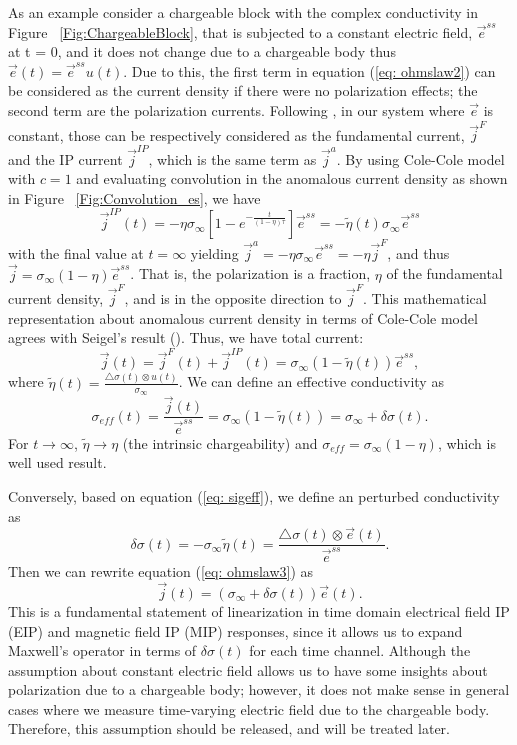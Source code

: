 \documentclass[a4paper, 11pt]{article}
\newcommand{\siginf}{\sigma_\infty}
\newcommand{\dsig}{\triangle\sigma}
\renewcommand {\j}  { {\vec j} }
\newcommand {\e}  { {\vec e} }
\newcommand{\peta}{\tilde{\eta}}
\newcommand{\sigpert}{\delta\sigma}
\begin{document}
As an example consider a chargeable block with the complex conductivity in Figure ~\ref{Fig:ChargeableBlock}, that is subjected to a constant electric field, $\e^{ss}$ at t = 0, and it does not change due to a chargeable body thus $\e(t) = \e^{ss}u(t)$. Due to this, the first term in equation (\ref{eq: ohmslaw2}) can be considered as the current density if there were no polarization effects; the second term are the polarization currents. Following \cite{Smith1988a}, in our system where $\e$ is constant, those can be respectively considered as the fundamental current, $\j^{F}$ and the IP current $\j^{IP}$, which is the same term as $\j^a$. By using Cole-Cole model with $c=1$  and evaluating convolution in the anomalous current density as shown in Figure ~\ref{Fig:Convolution_es}, we have
\begin{equation}
	\j^{IP}(t) = -\eta\siginf [1-e^{-\frac{t}{(1-\eta)\tau}}]\e^{ss} = -\peta(t)\siginf\e^{ss}
	\label{eq: IPdensity}
\end{equation}
with the final value at $t = \infty$ yielding $\j^a=-\eta\siginf\e^{ss}=-\eta\j^F$, and thus $\j = \siginf(1-\eta)\e^{ss}$. That is, the polarization is a fraction, $\eta$ of the fundamental current density, $\j^F$, and is in the opposite direction to $\j^F$. This mathematical representation  about anomalous current density in terms of Cole-Cole model agrees with Seigel's  result (\cite{seigel1959}). Thus, we have total current:
\begin{equation}
	\j(t) = \j^{F}(t) + \j^{IP}(t) = \siginf(1-\peta(t))\e^{ss},
  \label{eq: ohmslaw3}
\end{equation}
where $\peta(t) = \frac{\dsig(t)\otimes u(t)}{\siginf}$.
We can define an effective conductivity as
\begin{equation}
	\sigma_{eff}(t) = \frac{\j(t)}{\e^{ss}} = \siginf(1-\peta(t)) = \siginf + \delta\sigma(t).
  \label{eq: sigeff}
\end{equation}
For $t \rightarrow \infty$, $\peta\rightarrow \eta$ (the intrinsic chargeability) and $\sigma_{eff} = \siginf(1-\eta)$, which is well used result.

Conversely, based on equation (\ref{eq: sigeff}), we define an perturbed conductivity as
\begin{equation}
  \delta\sigma(t) = -\siginf\peta(t) =\frac{\dsig(t)\otimes \e(t)}{\e^{ss}}.
  \label{eq: sigpert}
\end{equation}
Then we can rewrite equation (\ref{eq: ohmslaw3}) as
\begin{equation}
  \j(t) = (\siginf + \delta\sigma(t))\e(t).
\end{equation}
This is a fundamental statement of linearization in time domain electrical field IP (EIP)  and magnetic field IP (MIP) responses, since it allows us to expand Maxwell's operator in terms of $\sigpert(t)$ for each time channel. Although the assumption about constant electric field allows us to have some insights about polarization due to a chargeable body; however, it does not make sense in general cases where we measure time-varying electric field due to the chargeable body. Therefore, this assumption should be released, and will be treated later.
\end{document}
